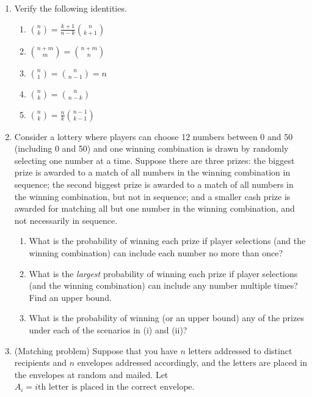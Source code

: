 \documentclass[
  letterpaper,
  DIV=11,
  numbers=noendperiod]{scrartcl}
\providecommand{\tightlist}{%
  \setlength{\itemsep}{0pt}\setlength{\parskip}{0pt}}\usepackage{longtable,booktabs,array}
\begin{document}
\begin{enumerate}
\def\labelenumi{\arabic{enumi}.}
\setcounter{enumi}{2}
\item
  Verify the following identities.

  \begin{enumerate}
  \def\labelenumii{\roman{enumii}.}
  \tightlist
  \item
    \({n \choose k} = \frac{k + 1}{n - k}{n \choose k + 1}\)
  \item
    \({n + m \choose m} = {n + m \choose n}\)
  \item
    \({n \choose 1} = {n \choose n - 1} = n\)
  \item
    \({n \choose k} = {n \choose n - k}\)
  \item
    \({n \choose k} = \frac{n}{k}{n - 1 \choose k - 1}\)
  \end{enumerate}
\item
  Consider a lottery where players can choose 12 numbers between 0 and
  50 (including 0 and 50) and one winning combination is drawn by
  randomly selecting one number at a time. Suppose there are three
  prizes: the biggest prize is awarded to a match of all numbers in the
  winning combination in sequence; the second biggest prize is awarded
  to a match of all numbers in the winning combination, but not in
  sequence; and a smaller cash prize is awarded for matching all but one
  number in the winning combination, and not necessarily in sequence.

  \begin{enumerate}
  \def\labelenumii{\roman{enumii}.}
  \tightlist
  \item
    What is the probability of winning each prize if player selections
    (and the winning combination) can include each number no more than
    once?
  \item
    What is the \emph{largest} probability of winning each prize if
    player selections (and the winning combination) can include any
    number multiple times? Find an upper bound.
  \item
    What is the probability of winning (or an upper bound) any of the
    prizes under each of the scenarios in (i) and (ii)?
  \end{enumerate}
\item
  (Matching problem) Suppose that you have \(n\) letters addressed to
  distinct recipients and \(n\) envelopes addressed accordingly, and the
  letters are placed in the envelopes at random and mailed. Let
  \(A_i = i\text{th letter is placed in the correct envelope}\).


\end{enumerate}
\end{document}
